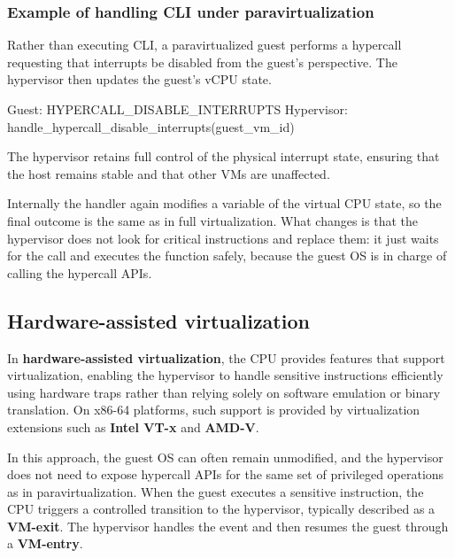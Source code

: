 \begin{center}
\end{center}

\subsubsection*{Example of handling CLI under paravirtualization}

Rather than executing CLI, a paravirtualized guest performs a hypercall requesting that interrupts be disabled from the guest's perspective. The hypervisor then updates the guest's vCPU state.

\begin{codeblock}
Guest:      HYPERCALL_DISABLE_INTERRUPTS
Hypervisor: handle_hypercall_disable_interrupts(guest_vm_id)
\end{codeblock}

The hypervisor retains full control of the physical interrupt state, ensuring that the host remains stable and that other VMs are unaffected.

Internally the handler again modifies a variable of the virtual CPU state, so the final outcome is the same as in full virtualization. What changes is that the hypervisor does not look for critical instructions and replace them: it just waits for the call and executes the function safely, because the guest OS is in charge of calling the hypercall APIs.

\begin{center}
\end{center}

\subsection{Hardware-assisted virtualization}

In \textbf{hardware-assisted virtualization}, the CPU provides features that support virtualization, enabling the hypervisor to handle sensitive instructions efficiently using hardware traps rather than relying solely on software emulation or binary translation. On x86-64 platforms, such support is provided by virtualization extensions such as \textbf{Intel VT-x} and \textbf{AMD-V}.

In this approach, the guest OS can often remain unmodified, and the hypervisor does not need to expose hypercall APIs for the same set of privileged operations as in paravirtualization. When the guest executes a sensitive instruction, the CPU triggers a controlled transition to the hypervisor, typically described as a \textbf{VM-exit}. The hypervisor handles the event and then resumes the guest through a \textbf{VM-entry}.

